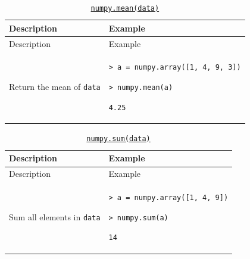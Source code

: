 \documentclass[10pt,a4paperpaper,]{article}
\begin{document}
\begin{longtable}[]{@{}ll@{}}
\caption{\href{http://docs.scipy.org/doc/numpy/reference/generated/numpy.mean.html}{\texttt{numpy.mean(data)}}}\tabularnewline
\toprule
\begin{minipage}[b]{0.47\columnwidth}\raggedright\strut
Description
\strut\end{minipage} &
\begin{minipage}[b]{0.47\columnwidth}\raggedright\strut
Example
\strut\end{minipage}\tabularnewline
\midrule
\endfirsthead
\toprule
\begin{minipage}[b]{0.47\columnwidth}\raggedright\strut
Description
\strut\end{minipage} &
\begin{minipage}[b]{0.47\columnwidth}\raggedright\strut
Example
\strut\end{minipage}\tabularnewline
\midrule
\endhead
\begin{minipage}[t]{0.47\columnwidth}\raggedright\strut
Return the mean of \texttt{data}
\strut\end{minipage} &
\begin{minipage}[t]{0.47\columnwidth}\raggedright\strut
\texttt{\textgreater{}\ a\ =\ numpy.array({[}1,\ 4,\ 9,\ 3{]})}

\texttt{\textgreater{}\ numpy.mean(a)}

\texttt{4.25}
\strut\end{minipage}\tabularnewline
\bottomrule
\end{longtable}

\begin{longtable}[]{@{}ll@{}}
\caption{\href{http://docs.scipy.org/doc/numpy/reference/generated/numpy.sum.html}{\texttt{numpy.sum(data)}}}\tabularnewline
\toprule
\begin{minipage}[b]{0.47\columnwidth}\raggedright\strut
Description
\strut\end{minipage} &
\begin{minipage}[b]{0.47\columnwidth}\raggedright\strut
Example
\strut\end{minipage}\tabularnewline
\midrule
\endfirsthead
\toprule
\begin{minipage}[b]{0.47\columnwidth}\raggedright\strut
Description
\strut\end{minipage} &
\begin{minipage}[b]{0.47\columnwidth}\raggedright\strut
Example
\strut\end{minipage}\tabularnewline
\midrule
\endhead
\begin{minipage}[t]{0.47\columnwidth}\raggedright\strut
Sum all elements in \texttt{data}
\strut\end{minipage} &
\begin{minipage}[t]{0.47\columnwidth}\raggedright\strut
\texttt{\textgreater{}\ a\ =\ numpy.array({[}1,\ 4,\ 9{]})}

\texttt{\textgreater{}\ numpy.sum(a)}

\texttt{14}
\strut\end{minipage}\tabularnewline
\bottomrule
\end{longtable}
\end{document}
